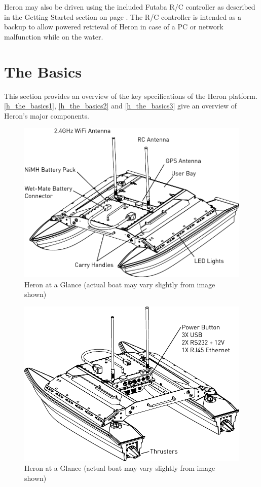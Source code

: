 \documentclass[]{clearpath-latex/clearpath-manual}
\begin{document}
Heron may also be driven using the included Futaba R/C controller as described in the Getting Started section on page \pageref{gettingstarted}. The R/C controller is intended as a backup to allow powered retrieval of Heron in case of a PC or network malfunction while on the water. 

\section{The Basics}
This section provides an overview of the key specifications of the Heron platform. \autoref{h_the_basics1}, \autoref{h_the_basics2} and \autoref{h_the_basics3} give an overview of Heron's major components.

\begin{figure}[h]
  \centering  \includegraphics[width=0.75\linewidth]{graphics/basics_1.pdf}
  \caption{Heron at a Glance (actual boat may vary slightly from image shown)}
  \label{h_the_basics1}
\end{figure}

\begin{figure}[h]
  \centering  \includegraphics[width=0.75\linewidth]{graphics/basics_2.pdf}
  \caption{Heron at a Glance (actual boat may vary slightly from image shown)}
  \label{h_the_basics2}
\end{figure}
\end{document}
